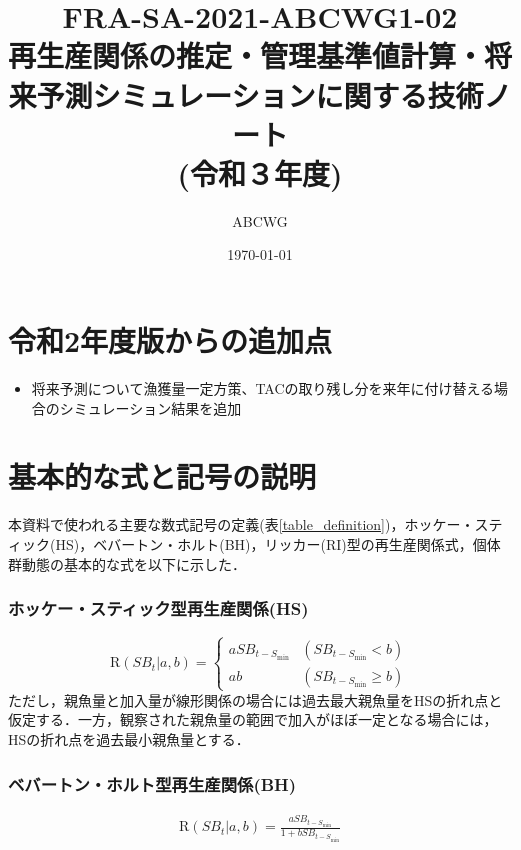 \documentclass[11pt]{jsarticle}
\begin{document}
\title{{\normalsize FRA-SA-2021-ABCWG1-02}\\
  再生産関係の推定・管理基準値計算・将来予測シミュレーションに関する技術ノート \\
  \Large (令和３年度)
}
\author{ABCWG}
\date{\today}
\maketitle

\section{令和2年度版からの追加点}
\begin{itemize}
\item 将来予測について漁獲量一定方策、TACの取り残し分を来年に付け替える場合のシミュレーション結果を追加
\end{itemize}

\section{基本的な式と記号の説明}
本資料で使われる主要な数式記号の定義(表\ref{table_definition})，ホッケー・スティック(HS)\cite{hockey}，ベバートン・ホルト(BH)\cite{beverton}，リッカー(RI)\cite{ricker}型の再生産関係式，個体群動態の基本的な式を以下に示した． 

\subsubsection*{ホッケー・スティック型再生産関係(HS)}
\begin{equation}
  \mathrm{R}(S\!B_{t}|a,b)=\begin{cases}
    a  S\!B_{t-S_{\mathrm{min}}} & (S\!B_{t-S_{\mathrm{min}}} < b) \\
    a  b                 & (S\!B_{t-S_{\mathrm{min}}} \geq b)
  \end{cases}
  \label{HS}
\end{equation}
ただし，親魚量と加入量が線形関係の場合には過去最大親魚量をHSの折れ点と仮定する．一方，観察された親魚量の範囲で加入がほぼ一定となる場合には，HSの折れ点を過去最小親魚量とする．

\subsubsection*{ベバートン・ホルト型再生産関係(BH)}
\begin{eqnarray}
  \mathrm{R}(S\!B_{t}|a,b)=\frac{a S\!B_{t-S_{\mathrm{min}}}}{1 + b S\!B_{t-S_{\mathrm{min}}}}
  \label{BH1}
\end{eqnarray}
\end{document}
